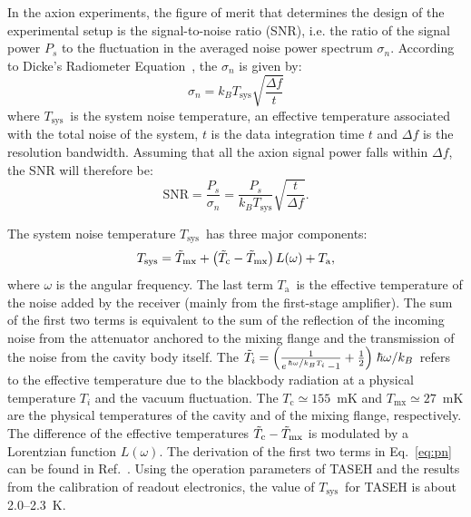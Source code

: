 \documentclass[%
 reprint,prl, %
superscriptaddress,
 amsmath,amssymb,
 aps,
]{revtex4-2}
\newcommand{\tsys}{\ensuremath{T_\text{sys}}}
\newcommand{\ta}{\ensuremath{T_\text{a}}}
\newcommand{\noise}{\ensuremath{1.9 - 2.2}}
\begin{document}
In the axion experiments, the figure of merit that determines the design of 
the experimental setup is the signal-to-noise ratio
(SNR), i.e. the ratio of the signal power $P_s$ to the fluctuation in 
the averaged noise power spectrum $\sigma_n$. 
According to Dicke's Radiometer Equation~\cite{Dicke}, the $\sigma_n$ 
is given by: 
\begin{equation}
 \sigma_n  =  k_B\tsys\sqrt{\frac{\Delta f}{t}} 
 \label{eq:sigman}
\end{equation}
where \tsys\ is the system noise temperature, an effective 
temperature associated with the total noise of the system, 
$t$ is the data integration time $t$ 
and $\Delta f$ is the resolution bandwidth. 
Assuming that all the axion signal power falls within $\Delta f$, 
the SNR will therefore be:
\begin{equation}
   \text{SNR}  =  \frac{P_s}{\sigma_n}=  \frac{P_s}{k_B\tsys}\sqrt{\frac{t}{\Delta f}}.
 \label{eq:SNR}
\end{equation}  


The system noise temperature \tsys\ has three major components:
\begin{equation}
 \tsys = \Tilde{T}_\text{mx} + \left(\Tilde{T}_\text{c}-\Tilde{T}_\text{mx}\right)L(\omega) + \ta,
\label{eq:pn}
\end{equation}
where $\omega$ is the angular frequency.
The last term \ta\ is the effective temperature of the
noise added by the receiver (mainly from the first-stage amplifier).
The sum of the first two terms is equivalent 
to the sum of the reflection of the incoming noise from
the attenuator anchored to the mixing flange  
and the transmission of the noise from the cavity body itself.
The
$\Tilde{T}_i=\left(\frac{1}{e^{\left.\hbar\omega\middle/k_BT_i\right.}-1} + \frac{1}{2}\right)\left. \hbar\omega\middle/k_B\right.$ refers to
the effective temperature due to
the blackbody radiation at a physical temperature $T_i$ and
the vacuum fluctuation.
The $T_\text{c}\simeq155$~mK and $T_\text{mx}\simeq27$~mK are the physical
temperatures of the cavity and of the mixing flange, respectively. The 
difference
of the effective temperatures $\Tilde{T}_\text{c}-\Tilde{T}_\text{mx}$ is
modulated by a Lorentzian function $L(\omega)$.
The derivation of the first two terms in Eq.~\eqref{eq:pn} can be found in
Ref.~\cite{TASEHAnalysis}. 
%
%
Using the operation parameters of TASEH and 
the results from the calibration of readout electronics, 
the value of \tsys\ for TASEH is about 2.0--2.3~K. 
\end{document}
